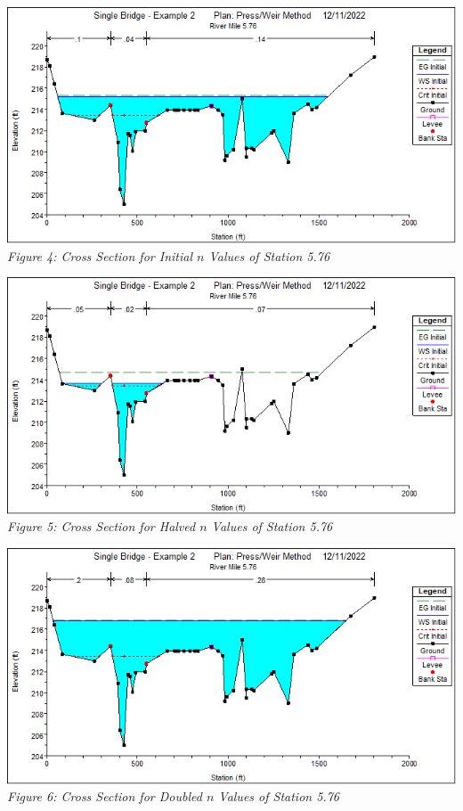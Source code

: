 \begin{center}
\newpage\begin{center}
    \includegraphics[scale=0.7, frame]{fig4.png}
    \\\emph{Figure 4: Cross Section for Initial $n$ Values of Station 5.76}\\
    \vspace{5mm}
    \includegraphics[scale=0.7, frame]{fig5.png}
    \\\emph{Figure 5: Cross Section for Halved $n$ Values of Station 5.76}\\
    \vspace{5mm}
    \includegraphics[scale=0.7, frame]{fig6.png}
    \\\emph{Figure 6: Cross Section for Doubled $n$ Values of Station 5.76}\\
\end{center}\newpage


\end{center}
